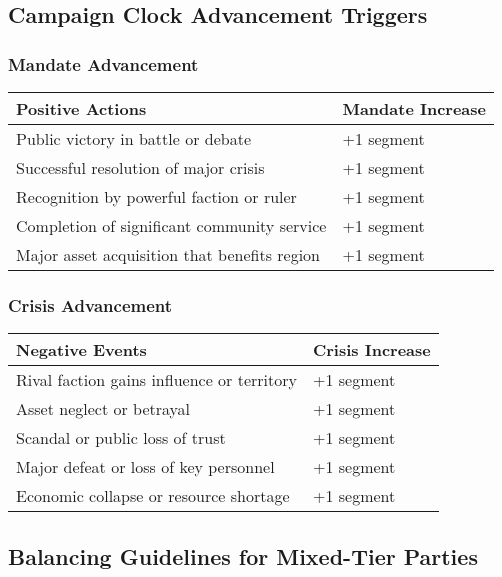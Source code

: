 \documentclass[11pt,letterpaper]{article}
\begin{document}
\subsection{Campaign Clock Advancement Triggers}

\subsubsection{Mandate Advancement}

\begin{longtable}{|>{\raggedright\arraybackslash}p{6cm}|>{\raggedright\arraybackslash}p{6cm}|}
\hline
\textbf{Positive Actions} & \textbf{Mandate Increase} \\
\hline
Public victory in battle or debate & +1 segment \\
Successful resolution of major crisis & +1 segment \\
Recognition by powerful faction or ruler & +1 segment \\
Completion of significant community service & +1 segment \\
Major asset acquisition that benefits region & +1 segment \\
\hline
\end{longtable}

\subsubsection{Crisis Advancement}

\begin{longtable}{|>{\raggedright\arraybackslash}p{6cm}|>{\raggedright\arraybackslash}p{6cm}|}
\hline
\textbf{Negative Events} & \textbf{Crisis Increase} \\
\hline
Rival faction gains influence or territory & +1 segment \\
Asset neglect or betrayal & +1 segment \\
Scandal or public loss of trust & +1 segment \\
Major defeat or loss of key personnel & +1 segment \\
Economic collapse or resource shortage & +1 segment \\
\hline
\end{longtable}

\subsection{Balancing Guidelines for Mixed-Tier Parties}
\end{document}

